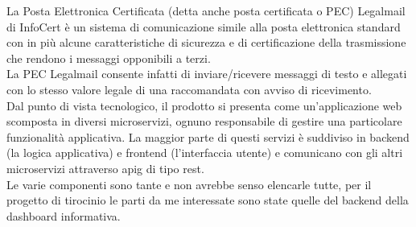 La Posta Elettronica Certificata (detta anche posta certificata o PEC) Legalmail di InfoCert è un sistema di comunicazione simile alla posta elettronica standard con in più alcune caratteristiche di sicurezza e di certificazione della trasmissione che rendono i messaggi opponibili a terzi.\\
La PEC Legalmail consente infatti di inviare/ricevere messaggi di testo e allegati con lo stesso valore legale di una raccomandata con avviso di ricevimento. \\
Dal punto di vista tecnologico, il prodotto si presenta come un'applicazione web scomposta in diversi \gls{microservizi}, ognuno responsabile di gestire una particolare funzionalità applicativa.
La maggior parte di questi servizi è suddiviso in backend (la logica applicativa) e frontend (l'interfaccia utente) e comunicano con gli altri microservizi attraverso \gls{apig} di tipo \gls{rest}.\\
Le varie componenti sono tante e non avrebbe senso elencarle tutte, per il progetto di tirocinio le parti da me interessate sono state quelle del backend della dashboard informativa.